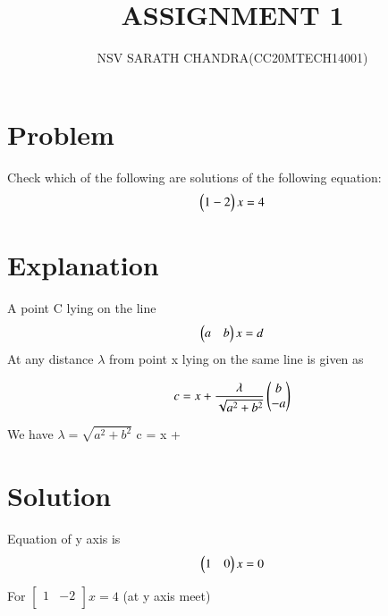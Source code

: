 \documentclass[journal,12pt,twocolumn]{IEEEtran}
\begin{document}
\title{ASSIGNMENT 1}
\author{NSV SARATH CHANDRA(CC20MTECH14001)}
\maketitle
\newpage
\bigskip
\renewcommand{\thefigure}{\theenumi}
\renewcommand{\thetable}{\theenumi}

	
\section{Problem}
Check which of the following are solutions of the following equation:
\begin{align} \begin{pmatrix}1 -2\end{pmatrix}x = 4\end{align}

\section{Explanation}\label{Explanation}

A point C lying on the line 
\begin{align}
    \begin{pmatrix}a & b\end{pmatrix}x = d
\end{align}
At any distance $\lambda$ from point x lying on the same line is given as 

\begin{align}
    c = x + \frac{\lambda}{\sqrt{a^2+b^2}}\begin{pmatrix}b \\ -a\end{pmatrix}
\end{align}

We have $\lambda = \sqrt{a^2+b^2}$ 
\implies c = x + 

\section{Solution}


Equation of y axis is 
\begin{align}
    \begin{pmatrix}1 & 0\end{pmatrix}x = 0
\end{align}

For   $\begin{bmatrix}
1 & -2 \\
\end{bmatrix}x = 4$ (at y axis meet)
\end{document}
